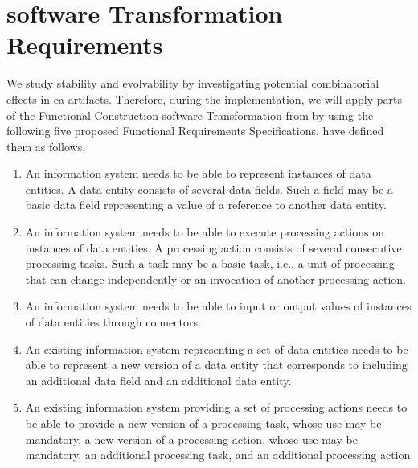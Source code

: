 \section{software Transformation Requirements} \label{sec_requirements_transformation}

We study stability and evolvability by investigating potential combinatorial effects in
\gls{ca} artifacts. Therefore, during the implementation, we will apply parts of the
Functional-Construction software Transformation from
\textcite[251]{mannaert_normalized_2016} by using the following five proposed Functional
Requirements Specifications. \textcite[254-261]{mannaert_normalized_2016} have defined
them as follows.

\begin{enumerate}[leftmargin=*]
    \item An information system needs to be able to represent instances of
    data entities. A data entity consists of several data fields. Such a field may be a basic
    data field representing a value of a reference to another data entity.
    
    \item An information system needs to be able to execute processing actions on
    instances of data entities. A processing action consists of several consecutive processing
    tasks. Such a task may be a basic task, i.e., a unit of processing that can change
    independently or an invocation of another processing action.
    
    \item An information system needs to be able to input or output values
    of instances of data entities through connectors.
    
    \item An existing information system representing a set of data entities needs to be
    able to represent a new version of a data entity that corresponds to including an
    additional data field and an additional data entity.
    
    \item An existing information system providing a set of processing actions needs to
    be able to provide a new version of a processing task, whose use may be mandatory, a
    new version of a processing action, whose use may be mandatory, an additional
    processing task, and an additional processing action
    
\end{enumerate}